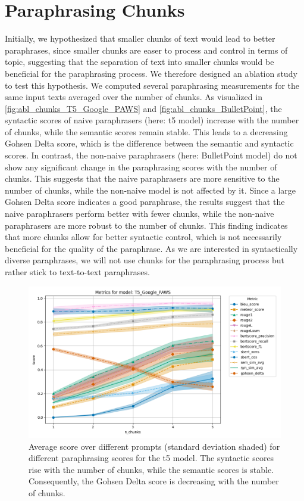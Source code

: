 \section{Paraphrasing Chunks}

Initially, we hypothesized that smaller chunks of text would lead to better paraphrases, 
since smaller chunks are easer to process and control in terms of topic,
suggesting that the separation of text into smaller chunks would be beneficial for the paraphrasing process.
We therefore designed an ablation study to test this hypothesis.
We computed several paraphrasing measurements for the same input texts averaged over the number of chunks.
As visualized in \autoref{fig:abl_chunks_T5_Google_PAWS} and \autoref{fig:abl_chunks_BulletPoint},
the syntactic scores of naive paraphrasers (here: \ac{t5} model) increase with the number of chunks,
while the semantic scores remain stable.
This leads to a decreasing Gohsen Delta score, which is the difference between the semantic and syntactic scores.
In contrast, the non-naive paraphrasers (here: BulletPoint model) do not show any significant change in the paraphrasing scores with the number of chunks.
This suggests that the naive paraphrasers are more sensitive to the number of chunks, 
while the non-naive model is not affected by it.
Since a large Gohsen Delta score indicates a good paraphrase,
the results suggest that the naive paraphrasers perform better with fewer chunks, 
while the non-naive paraphrasers are more robust to the number of chunks.
This finding indicates that more chunks allow for better syntactic control, which is not necessarily beneficial for the quality of the paraphrase.
As we are interested in syntactically diverse paraphrases,
we will not use chunks for the paraphrasing process but rather stick to text-to-text paraphrases.
 
\begin{figure}[htbp]
    \centering
    \includegraphics[width=\textwidth]{images/paraphrasing/experiments/T5_Google_PAWS_metrics_plot.png}
    \caption{Average score over different prompts (standard deviation shaded) for different paraphrasing scores for the \ac{t5} model.
    The syntactic scores rise with the number of chunks, while the semantic scores is stable.
    Consequently, the Gohsen Delta score is decreasing with the number of chunks.}
    \label{fig:abl_chunks_T5_Google_PAWS}
\end{figure}

